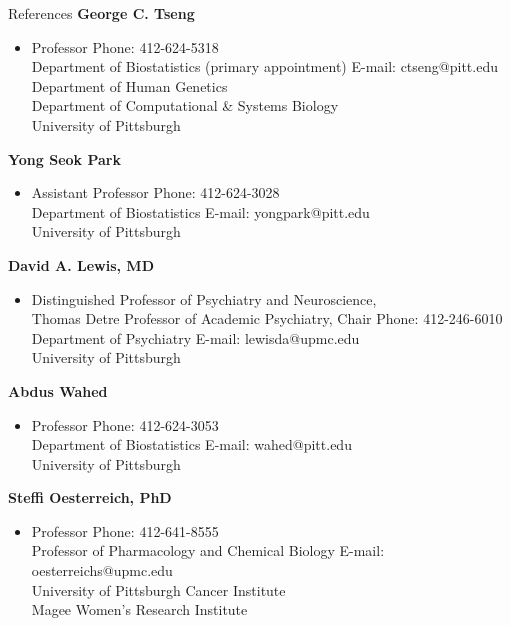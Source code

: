 \documentclass{resume} %
\begin{document}

\begin{rSection}{References}
\textbf{George C. Tseng}
\begin{itemize}[noitemsep,topsep=0pt]
\item[] Professor \hfill {Phone: 412-624-5318}\\
Department of Biostatistics (primary appointment) \hfill{E-mail: ctseng@pitt.edu }\\
Department of Human Genetics \\
Department of Computational \& Systems Biology 
\\
University of Pittsburgh
\end{itemize}

\textbf{Yong Seok Park}
\begin{itemize}[noitemsep,topsep=0pt]
\item[] Assistant Professor \hfill {Phone: 412-624-3028}\\
Department of Biostatistics \hfill{E-mail: yongpark@pitt.edu}\\
University of Pittsburgh
\end{itemize}

\textbf{David A. Lewis, MD}
\begin{itemize}[noitemsep,topsep=0pt]
\item[] Distinguished Professor of Psychiatry and Neuroscience, \\
Thomas Detre Professor of Academic Psychiatry, Chair  
\hfill {Phone: 412-246-6010}\\
Department of Psychiatry \hfill{E-mail: lewisda@upmc.edu}\\
University of Pittsburgh
\end{itemize}

\textbf{Abdus Wahed}
\begin{itemize}[noitemsep,topsep=0pt]
\item[]  Professor \hfill {Phone: 412-624-3053}\\
Department of Biostatistics \hfill{E-mail: wahed@pitt.edu}\\
University of Pittsburgh
\end{itemize}

\textbf{Steffi Oesterreich, PhD}
\begin{itemize}[noitemsep,topsep=0pt]
\item[] Professor  
\hfill {Phone: 412-641-8555 }\\
Professor of Pharmacology and Chemical Biology \hfill{E-mail: oesterreichs@upmc.edu }\\
University of Pittsburgh Cancer Institute\\
Magee Women's Research Institute

\end{itemize}

\end{rSection}
\end{document}
